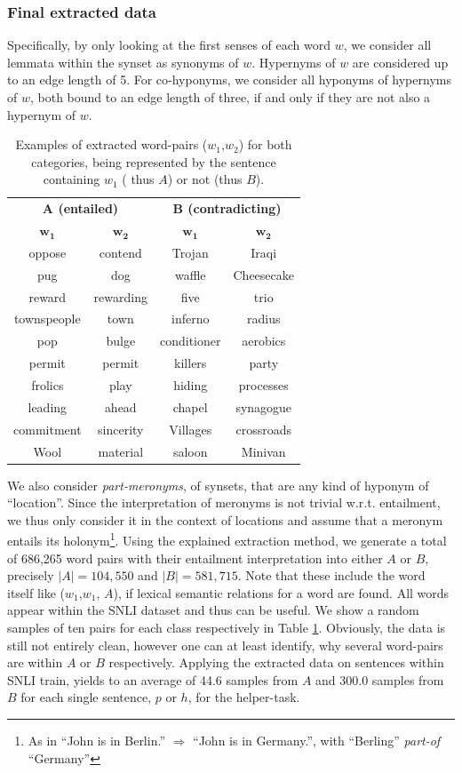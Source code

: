 \subsubsection{Final extracted data}
Specifically, by only looking at the first senses of each word $w$, we consider all lemmata within the synset as synonyms of $w$. Hypernyms of $w$ are considered up to an edge length of 5. For co-hyponyms, we consider all hyponyms of hypernyms of $w$, both bound to an edge length of three, if and only if they are not also a hypernym of $w$. 
\begin{table}[tph!]
\centering
\begin{tabular}{cc|cc}
\multicolumn{2}{c}{\textbf{$\mathbf{A}$ (entailed)}} & \multicolumn{2}{c}{\textbf{$\mathbf{B}$ (contradicting)}} \\
\textbf{$\mathbf{w_1}$} & \textbf{$\mathbf{w_2}$} & \textbf{$\mathbf{w_1}$} & \textbf{$\mathbf{w_2}$} \\
\toprule
oppose & contend & Trojan & Iraqi\\
pug & dog & waffle & Cheesecake\\
reward & rewarding & five & trio \\
townspeople & town & inferno & radius \\
pop & bulge & conditioner & aerobics\\
permit & permit & killers & party\\
frolics & play & hiding & processes\\
leading & ahead & chapel & synagogue\\
commitment & sincerity & Villages & crossroads\\
Wool & material & saloon & Minivan\\
\bottomrule
\end{tabular}
\caption{Examples of extracted word-pairs ($w_1$,$w_2$) for both categories, being represented by the sentence containing $w_1$ ( thus $A$) or not (thus $B$).}
\label{tab:examples_extracted_wn}
\end{table}
We also consider \textit{part-meronyms}, of synsets, that are any kind of hyponym of ``location''. Since the interpretation of meronyms is not trivial w.r.t. entailment, we thus only consider it in the context of locations and assume that a meronym entails its holonym\footnote{As in ``John is in Berlin.'' $\Rightarrow$ ``John is in Germany.'', with ``Berling'' \textit{part-of} ``Germany''}. Using the explained extraction method, we generate a total of 686,265 word pairs with their entailment interpretation into either $A$ or $B$, precisely $|A|=104,550$ and $|B|=581,715$. Note that these include the word itself like ($w_1$,$w_1$, $A$), if lexical semantic relations for a word are found. All words appear within the \ac{SNLI} dataset and thus can be useful. We show a random samples of ten pairs for each class respectively in Table \ref{tab:examples_extracted_wn}.
Obviously, the data is still not entirely clean, however one can at least identify, why several word-pairs are within $A$ or $B$ respectively. Applying the extracted data on sentences within \ac{SNLI} train, yields to an average of 44.6 samples from $A$ and 300.0 samples from $B$ for each single sentence, $p$ or $h$, for the helper-task.
